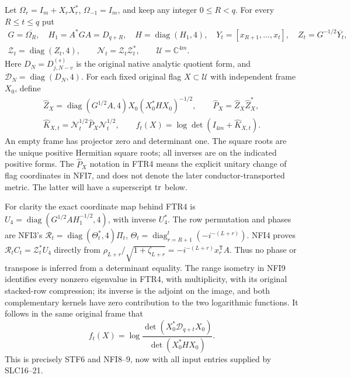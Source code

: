 \documentclass[11pt,a4paper]{article}
\begin{document}
Let $\Omega_r=I_m+X_rX_r^*$, $\Omega_{-1}=I_m$, and keep any
integer $0\le R<q$. For every $R\le t\le q$ put
\[
\begin{gathered}
 G=\overline{\Omega_R},\quad H_1=A^*GA=D_{q+R},\quad
 H=\operatorname{diag}(H_1,4),\quad
 Y_t=[x_{R+1},\ldots,x_t],\quad Z_t=G^{-1/2}\overline{Y_t},\\
 \mathscr Z_t=\operatorname{diag}(Z_t,4),\qquad
 \mathscr N_t=\mathscr Z_t\mathscr Z_t^*,\qquad
 \mathcal U=\mathbb C^{4m} .                              \tag{FTR3}
\end{gathered}
\]
Here $D_N=D_{j,N-v}^{(s)}$ is the original native analytic quotient
form, and $\mathcal D_N=\operatorname{diag}(D_N,4)$.
For each fixed original flag $X\subset\mathcal U$ with independent
frame $X_0$, define
\[
\begin{gathered}
 \widehat Z_X=\operatorname{diag}(G^{1/2}A,4)
                 X_0(X_0^*HX_0)^{-1/2},\qquad
 \widehat P_X=\widehat Z_X\widehat Z_X^*,\\
 \widehat K_{X,t}=\mathscr N_t^{1/2}\widehat P_X
                                      \mathscr N_t^{1/2},\qquad
 f_t(X)=\log\det(I_{4m}+\widehat K_{X,t}).                 \tag{FTR4}
\end{gathered}
\]
An empty frame has projector zero and determinant one. The square
roots are the unique positive Hermitian square roots; all inverses
are on the indicated positive forms. The $\widehat P_X$ notation
in FTR4 means the explicit unitary change of flag coordinates in
NFI7, and does not denote the later conductor-transported metric.
The latter will have a superscript ${\rm tr}$ below.

For clarity the exact coordinate map behind FTR4 is
$U_4=\operatorname{diag}(G^{1/2}AH_1^{-1/2},4)$, with inverse
$U_4^*$. The row permutation and phases are NFI3's
$\mathscr R_t=\operatorname{diag}(\Theta_t^*,4)\Pi_t$,
$\Theta_t=\operatorname{diag}_{r=R+1}^{t}(-i^{-(L+r)})$.
NFI4 proves $\mathscr R_tC_t=\mathscr Z_t^*U_4$ directly from
$\rho_{L+r}/\sqrt{1+\zeta_{L+r}}=-i^{-(L+r)}x_r^{\mathsf T}A$.
Thus no phase or transpose is inferred from a determinant equality.
The range isometry in NFI9 identifies every nonzero eigenvalue in
FTR4, with multiplicity, with its original stacked-row compression;
its inverse is the adjoint on the image, and both complementary
kernels have zero contribution to the two logarithmic functions.
It follows in the same original frame that
\[
 f_t(X)=\log\frac{\det(X_0^*\mathcal D_{q+t}X_0)}
                              {\det(X_0^*HX_0)} .        \tag{FTR5}
\]
This is precisely STF6 and NFI8--9, now with all input entries
supplied by SLC16--21.
\end{document}
